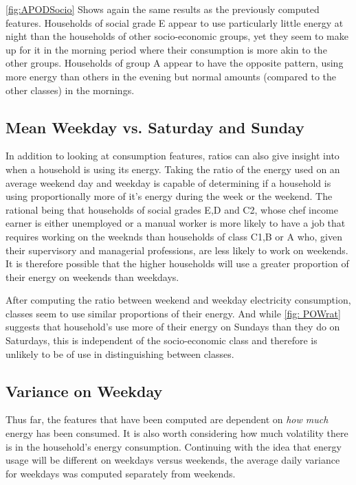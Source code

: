 \APODSocio

\ref{fig:APODSocio} Shows again the same results as the previously computed features. Households of social grade E appear to use particularly little energy at night than the households of other socio-economic groups, yet they seem to make up for it in the morning period where their consumption is more akin to the other groups. Households of group A appear to have the opposite pattern, using more energy than others in the evening but normal amounts (compared to the other classes) in the mornings.


\subsection*{Mean Weekday vs. Saturday and Sunday}
In addition to looking at consumption features, ratios can also give insight into when a household is using its energy. Taking the ratio of the energy used on an average weekend day and weekday is capable of determining if a household is using proportionally more of it's energy during the week or the weekend. The rational being that households of social grades E,D and C2, whose chef income earner is either unemployed or a manual worker is more likely to have a job that requires working on the weeknds than households of class C1,B or A who, given their supervisory and managerial professions, are less likely to work on weekends. It is therefore possible that the higher households will use a greater proportion of their energy on weekends than weekdays. 
\POWrat

After computing the ratio between weekend and weekday electricity consumption, classes seem to use similar proportions of their energy. And while \ref{fig: POWrat} suggests that household's use more of their energy on Sundays than they do on Saturdays, this is independent of the socio-economic class and therefore is unlikely to be of use in distinguishing between classes.


\subsection*{Variance on Weekday}
Thus far, the features that have been computed are dependent on \textit{how much} energy has been consumed. It is also worth considering how much volatility there is in the household's energy consumption. Continuing with the idea that energy usage will be different on weekdays versus weekends, the average daily variance for weekdays was computed separately from weekends. 

